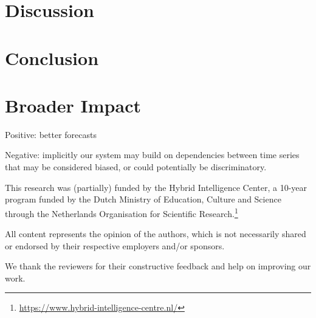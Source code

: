\documentclass{article}
\begin{document}
\section{Discussion}
  \label{sec:discussion}


\section{Conclusion}
  \label{sec:conclusion}


\section*{Broader Impact}

  Positive: better forecasts

  Negative: implicitly our system may build on dependencies between time series that may be considered biased, or could potentially be discriminatory. 

\begin{ack}
  This research was (partially) funded by the Hybrid Intelligence Center, a 10-year program funded by the Dutch Ministry of Education, Culture and Science through the Netherlands Organisation for Scientific Research.\footnote{\url{https://www.hybrid-intelligence-centre.nl/}}

  All content represents the opinion of the authors, which is not necessarily shared or endorsed by their respective employers and/or sponsors.
  
  We thank the reviewers for their constructive feedback and help on improving our work. 

\end{ack}

 


\clearpage
\appendix
\end{document}
